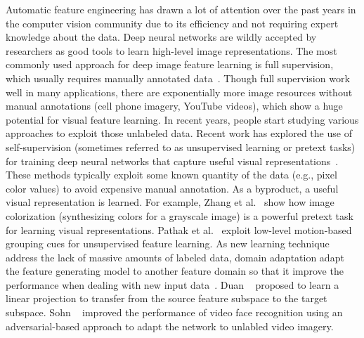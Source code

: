 Automatic feature engineering has drawn a lot of attention over the
past years in the computer vision community due to its efficiency and
not requiring expert knowledge about the data. Deep neural networks
are wildly accepted by researchers as good tools to learn high-level
image representations.
The most commonly used approach for deep image feature learning is
full supervision, which usually requires manually annotated
data~\cite{yosinski2014transferable,zhou2016learning,wen2016discriminative}.
Though full supervision work well in many applications, there are
exponentially more image resources without manual annotations (cell
phone imagery, YouTube videos\etc), which show a huge potential for
visual feature learning.  In recent years, people start studying
various approaches to exploit those unlabeled data. 
%
Recent work has explored the use of self-supervision (sometimes
referred to as unsupervised learning or pretext tasks) for training
deep neural networks that capture useful visual
representations~\cite{doersch2015unsupervised,pathak2016context}. 
These methods typically
exploit some known quantity of the data (e.g., pixel color values) to
avoid expensive manual annotation. As a byproduct, a useful visual
representation is learned.
For example, Zhang et al.~\cite{zhang2016colorful} show how image
colorization (synthesizing colors for a grayscale image) is a powerful
pretext task for learning visual representations. Pathak et
al.~\cite{pathak2017learning} exploit low-level motion-based grouping
cues for unsupervised feature learning.  
%
As new learning technique address the lack of massive amounts of
labeled data, domain adaptation adapt the feature generating model to
another feature domain so that it improve the performance when dealing
with new input
data~\cite{fernando2013unsupervised,fernando2015joint,saenko2010adapting,wang2016actions,tinghui2016flow}.
Duan \etal~\cite{duan2012learning} proposed to learn a linear
projection to transfer from the source feature subspace to the target
subspace. Sohn \etal~\cite{sohn2017unsupervised} improved the
performance of video face recognition using an adversarial-based
approach to adapt the network to unlabled video imagery.


